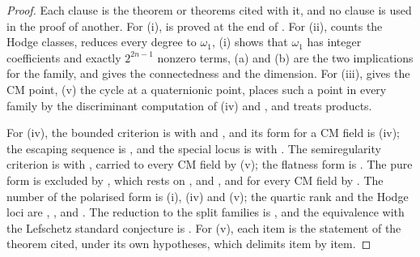 \begin{proof}
Each clause is the theorem or theorems cited with it, and no clause is used
in the proof of another. For (i),  is proved at the end of
. For (ii),  counts the Hodge
classes,  reduces every degree to $\omega_{1}$,
(i) shows that $\omega_{1}$ has integer coefficients
and exactly $2^{2n-1}$ nonzero terms, (a) and (b) are the
two implications for the family, and  gives the
connectedness and the dimension. For (iii),  gives the
CM point, (v) the cycle at a quaternionic point,
 places such a point in every family by the
discriminant computation of (iv) and ,
and  treats products.

For (iv), the bounded criterion is  with
 and , and its form for a CM field
is (iv); the escaping sequence is ,
and the special locus is  with
. The semiregularity criterion is
 with , carried to every CM field
by (v); the flatness form is . The
pure form is excluded by , which rests on
,  and
, and for every CM field by
. The number of the polarised form is
(i),
(iv) and (v); the quartic rank and the Hodge loci are
, , 
and . The reduction to the split families is
, and the equivalence with the Lefschetz standard
conjecture is . For (v), each item is the statement of
the theorem cited, under its own hypotheses, which  delimits
item by item.


\end{proof}
